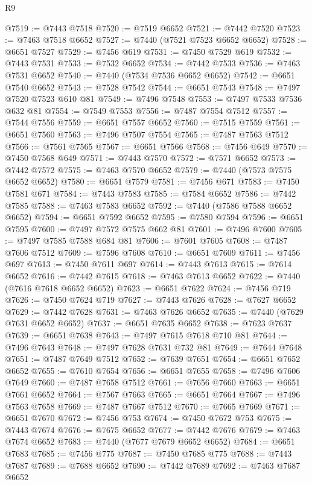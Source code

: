 \begin{lexlean}{R9}
\begin{coremodule}
@7519 := @7443 @7518
@7520 := @7519 @6652
@7521 := @7442 @7520
@7523 := @7463 @7518 @6652
@7527 := @7440 (@7521 @7523 @6652 @6652)
@7528 := @6651 @7527
@7529 := @7456 @619
@7531 := @7450 @7529 @619
@7532 := @7443 @7531
@7533 := @7532 @6652
@7534 := @7442 @7533
@7536 := @7463 @7531 @6652
@7540 := @7440 (@7534 @7536 @6652 @6652)
@7542 := @6651 @7540 @6652
@7543 := @7528 @7542
@7544 := @6651 @7543
@7548 := @7497 @7520 @7523 @610 @81
@7549 := @7496 @7548
@7553 := @7497 @7533 @7536 @632 @81
@7554 := @7549 @7553
@7556 := @7487 @7554 @7512
@7557 := @7544 @7556
@7559 := @6651 @7557 @6652
@7560 := @7515 @7559
@7561 := @6651 @7560
@7563 := @7496 @7507 @7554
@7565 := @7487 @7563 @7512
@7566 := @7561 @7565
@7567 := @6651 @7566
@7568 := @7456 @649
@7570 := @7450 @7568 @649
@7571 := @7443 @7570
@7572 := @7571 @6652
@7573 := @7442 @7572
@7575 := @7463 @7570 @6652
@7579 := @7440 (@7573 @7575 @6652 @6652)
@7580 := @6651 @7579
@7581 := @7456 @671
@7583 := @7450 @7581 @671
@7584 := @7443 @7583
@7585 := @7584 @6652
@7586 := @7442 @7585
@7588 := @7463 @7583 @6652
@7592 := @7440 (@7586 @7588 @6652 @6652)
@7594 := @6651 @7592 @6652
@7595 := @7580 @7594
@7596 := @6651 @7595
@7600 := @7497 @7572 @7575 @662 @81
@7601 := @7496 @7600
@7605 := @7497 @7585 @7588 @684 @81
@7606 := @7601 @7605
@7608 := @7487 @7606 @7512
@7609 := @7596 @7608
@7610 := @6651 @7609
@7611 := @7456 @697
@7613 := @7450 @7611 @697
@7614 := @7443 @7613
@7615 := @7614 @6652
@7616 := @7442 @7615
@7618 := @7463 @7613 @6652
@7622 := @7440 (@7616 @7618 @6652 @6652)
@7623 := @6651 @7622
@7624 := @7456 @719
@7626 := @7450 @7624 @719
@7627 := @7443 @7626
@7628 := @7627 @6652
@7629 := @7442 @7628
@7631 := @7463 @7626 @6652
@7635 := @7440 (@7629 @7631 @6652 @6652)
@7637 := @6651 @7635 @6652
@7638 := @7623 @7637
@7639 := @6651 @7638
@7643 := @7497 @7615 @7618 @710 @81
@7644 := @7496 @7643
@7648 := @7497 @7628 @7631 @732 @81
@7649 := @7644 @7648
@7651 := @7487 @7649 @7512
@7652 := @7639 @7651
@7654 := @6651 @7652 @6652
@7655 := @7610 @7654
@7656 := @6651 @7655
@7658 := @7496 @7606 @7649
@7660 := @7487 @7658 @7512
@7661 := @7656 @7660
@7663 := @6651 @7661 @6652
@7664 := @7567 @7663
@7665 := @6651 @7664
@7667 := @7496 @7563 @7658
@7669 := @7487 @7667 @7512
@7670 := @7665 @7669
@7671 := @6651 @7670
@7672 := @7456 @753
@7674 := @7450 @7672 @753
@7675 := @7443 @7674
@7676 := @7675 @6652
@7677 := @7442 @7676
@7679 := @7463 @7674 @6652
@7683 := @7440 (@7677 @7679 @6652 @6652)
@7684 := @6651 @7683
@7685 := @7456 @775
@7687 := @7450 @7685 @775
@7688 := @7443 @7687
@7689 := @7688 @6652
@7690 := @7442 @7689
@7692 := @7463 @7687 @6652

\end{coremodule}
\end{lexlean}
